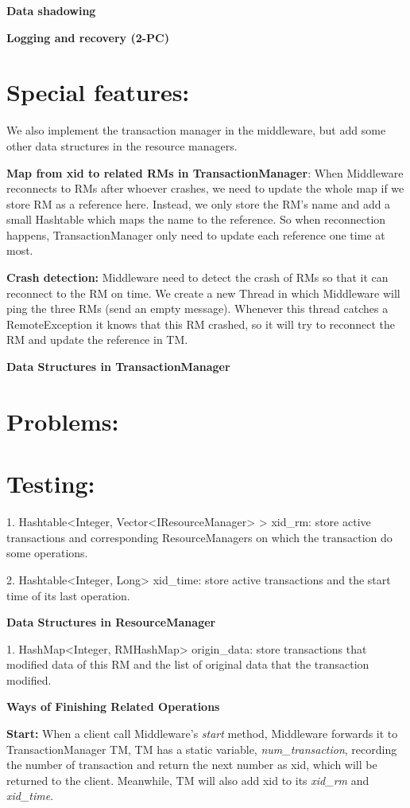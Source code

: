 \documentclass[a4paper, 12pt]{article}
\newcommand{\newQuestion}[1]{\section{#1}}
\newcommand{\newPart}[1]{\textbf{\large #1}}
\begin{document}
\newPart{Data shadowing}

\newPart{Logging and recovery (2-PC)}

\newQuestion{Special features:} We also implement the transaction manager in the middleware, but add some other data structures in the resource managers.

\textbf{Map from xid to related RMs in TransactionManager}: When Middleware reconnects to RMs after whoever crashes, we need to update the whole map if we store RM as a reference here. Instead, we only store the RM's name and add a small Hashtable which maps the name to the reference. So when reconnection happens, TransactionManager only need to update each reference one time at most.

\textbf{Crash detection:} Middleware need to detect the crash of RMs so that it can reconnect to the RM on time. We create a new Thread in which Middleware will ping the three RMs (send an empty message). Whenever this thread catches a RemoteException it knows that this RM crashed, so it will try to reconnect the RM and update the reference in TM.

\newPart{Data Structures in TransactionManager}

\newQuestion{Problems:}

\newQuestion{Testing:}

\pagebreak







1. Hashtable<Integer, Vector<IResourceManager> > xid\_rm: store active transactions and corresponding ResourceManagers on which the transaction do some operations.

2. Hashtable<Integer, Long> xid\_time: store active transactions and the start time of its last operation.

\newPart{Data Structures in ResourceManager}

1. HashMap<Integer, RMHashMap> origin\_data: store transactions that modified data of this RM and the list of original data that the transaction modified.

\newPart{Ways of Finishing Related Operations}

\textbf{Start:} When a client call Middleware's \textit{start} method, Middleware forwards it to TransactionManager TM, TM has a static variable, \textit{num\_transaction}, recording the number of transaction and return the next number as xid, which will be returned to the client. Meanwhile, TM will also add xid to its \textit{xid\_rm} and \textit{xid\_time}.
\end{document}
